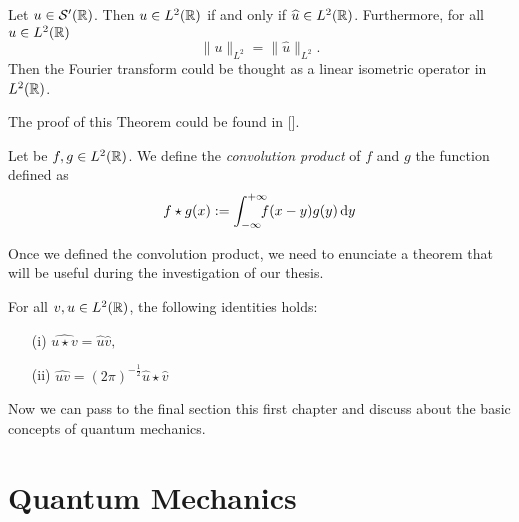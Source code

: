  \begin{theorem}
 	\label{th:planch}
 	Let $u\in \mathcal{S}'({\mathbb R})$. Then $u\in L^2({\mathbb R})$ if and only if $\widehat{u}\in L^2({\mathbb R})$. Furthermore, for all $u\in L^2({\mathbb R})$
 	\begin{equation}
 		\|u\|_{L^2}=\|\hat{u}\|_{L^2}.
 	\end{equation}
 	Then the Fourier transform could be thought as a linear isometric operator in $L^2({\mathbb R})$.
 \end{theorem}
 
 	 The proof of this Theorem could be found in [\citealp[Th. 6.1]{gila}].%


\begin{definition}
	Let be $f,g\in L^2({\mathbb R})$. We define the \textit{convolution product} of $f$ and $g$ the function defined as 
	\begin{equation}
		f\star g(x):=\int_{-\infty}^{+\infty}\!\!\!\! f(x-y)g(y)\, \mathrm d y
		\label{eq:convolution}
	\end{equation}
\end{definition} 
Once we defined the convolution product, we need to enunciate a theorem that will be useful during the investigation of our thesis.
\begin{theorem}
	\label{th:conv_theorem}
	For all $v,u\in L^2({\mathbb R})$, the following identities holds:
	\begin{itemize}
		\item[(i)] $\hat{u\star v}=\hat{u}\hat{v},$
		\item[(ii)] $ \hat{uv}=(2\pi)^{-\frac{1}{2}}\hat{u}\star \hat{v}$
	\end{itemize}
\end{theorem}
  Now we can pass to the final section this first chapter and discuss about the basic concepts of quantum mechanics.
 
 \section{Quantum Mechanics}
 \label{sec:quantum_mechanincs}
